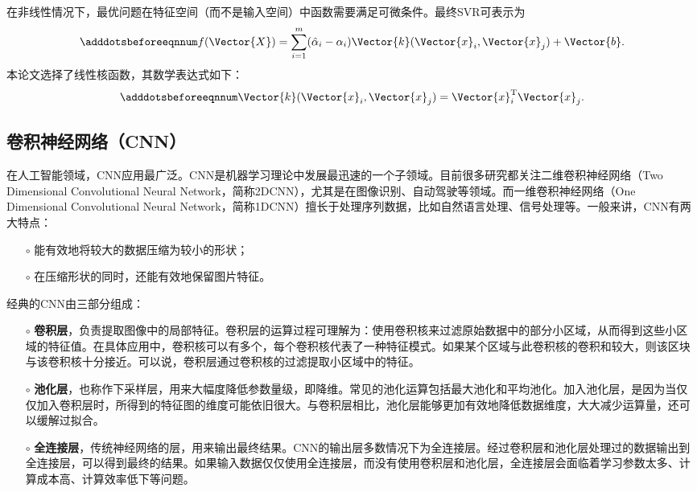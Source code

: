 在非线性情况下，最优问题在特征空间（而不是输入空间）中函数需要满足可微条件。最终SVR可表示为
\begin{equation}\adddotsbeforeeqnnum
  \label{eq:ml_svr_kernel_v2}
  f(\Vector{X})=\sum_{i=1}^{m}(\hat{\alpha}_i-\alpha_i)\Vector{k}(\Vector{x}_i,\Vector{x}_j)+\Vector{b}.
\end{equation}
本论文选择了线性核函数，其数学表达式如下：
\begin{equation}\adddotsbeforeeqnnum
  \label{eq:ml_svr_kernel_linear}
  \Vector{k}(\Vector{x}_i,\Vector{x}_j)=\Vector{x}_i^{\text{T}}\Vector{x}_j.
\end{equation}

\subsection{卷积神经网络（CNN）}\label{sec:ml_cnn}

在人工智能领域，CNN应用最广泛。CNN是机器学习理论中发展最迅速的一个子领域。目前很多研究都关注二维卷积神经网络（Two Dimensional Convolutional Neural Network，简称2DCNN），尤其是在图像识别、自动驾驶等领域。而一维卷积神经网络（One Dimensional Convolutional Neural Network，简称1DCNN）擅长于处理序列数据，比如自然语言处理、信号处理等。一般来讲，CNN有两大特点：
\begin{itemize}
  \item[$\circ$] 能有效地将较大的数据压缩为较小的形状；
  \item[$\circ$] 在压缩形状的同时，还能有效地保留图片特征。
\end{itemize}

经典的CNN由三部分组成：
\begin{itemize}
  \item[$\circ$] \textbf{卷积层}，负责提取图像中的局部特征。卷积层的运算过程可理解为：使用卷积核来过滤原始数据中的部分小区域，从而得到这些小区域的特征值。在具体应用中，卷积核可以有多个，每个卷积核代表了一种特征模式。如果某个区域与此卷积核的卷积和较大，则该区块与该卷积核十分接近。可以说，卷积层通过卷积核的过滤提取小区域中的特征。
  \item[$\circ$] \textbf{池化层}，也称作下采样层，用来大幅度降低参数量级，即降维。常见的池化运算包括最大池化和平均池化。加入池化层，是因为当仅仅加入卷积层时，所得到的特征图的维度可能依旧很大。与卷积层相比，池化层能够更加有效地降低数据维度，大大减少运算量，还可以缓解过拟合。
  \item[$\circ$] \textbf{全连接层}，传统神经网络的层，用来输出最终结果。CNN的输出层多数情况下为全连接层。经过卷积层和池化层处理过的数据输出到全连接层，可以得到最终的结果。如果输入数据仅仅使用全连接层，而没有使用卷积层和池化层，全连接层会面临着学习参数太多、计算成本高、计算效率低下等问题。
\end{itemize}

